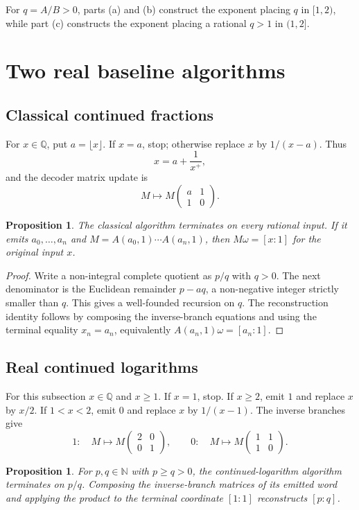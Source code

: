 \documentclass[10pt]{article}
\newtheorem{proposition}[theorem]{Proposition}
\theoremstyle{definition}
\theoremstyle{remark}
\newcommand{\Q}{\mathbb{Q}}
\newcommand{\N}{\mathbb{N}}
\newcommand{\Proj}[2]{[#1:#2]}
\newcommand{\mat}[4]{\begin{pmatrix}#1&#2\\#3&#4\end{pmatrix}}
\begin{document}
For $q=A/B>0$, parts (a) and (b) construct the exponent placing $q$ in $[1,2)$, while part (c) constructs the exponent placing a rational $q>1$ in $(1,2]$.

\section{Two real baseline algorithms}

\subsection{Classical continued fractions}

For $x\in\Q$, put $a=\lfloor x\rfloor$.  If $x=a$, stop; otherwise replace $x$ by $1/(x-a)$.  Thus
\[
 x=a+\frac1{x^+},
\]
and the decoder matrix update is
\[
 M\longmapsto M\mat{a}{1}{1}{0}.
\]

\begin{proposition}\label{prop:real-cf-finite}
The classical algorithm terminates on every rational input.  If it emits $a_0,\ldots,a_n$ and $M=A(a_0,1)\cdots A(a_n,1)$, then $M\omega=\Proj{x}{1}$ for the original input $x$.
\end{proposition}

\begin{proof}
Write a non-integral complete quotient as $p/q$ with $q>0$.  The next denominator is the Euclidean remainder $p-aq$, a non-negative integer strictly smaller than $q$.  This gives a well-founded recursion on $q$.  The reconstruction identity follows by composing the inverse-branch equations and using the terminal equality $x_n=a_n$, equivalently $A(a_n,1)\omega=\Proj{a_n}{1}$.
\end{proof}

\subsection{Real continued logarithms}

For this subsection $x\in\Q$ and $x\ge1$.  If $x=1$, stop.  If $x\ge2$, emit $1$ and replace $x$ by $x/2$.  If $1<x<2$, emit $0$ and replace $x$ by $1/(x-1)$.  The inverse branches give
\[
 1:\quad M\longmapsto M\mat{2}{0}{0}{1},
 \qquad
 0:\quad M\longmapsto M\mat{1}{1}{1}{0}.
\]

\begin{proposition}\label{prop:cl-finite}
For $p,q\in\N$ with $p\ge q>0$, the continued-logarithm algorithm terminates on $p/q$.  Composing the inverse-branch matrices of its emitted word and applying the product to the terminal coordinate $\Proj{1}{1}$ reconstructs $\Proj{p}{q}$.
\end{proposition}
\end{document}
